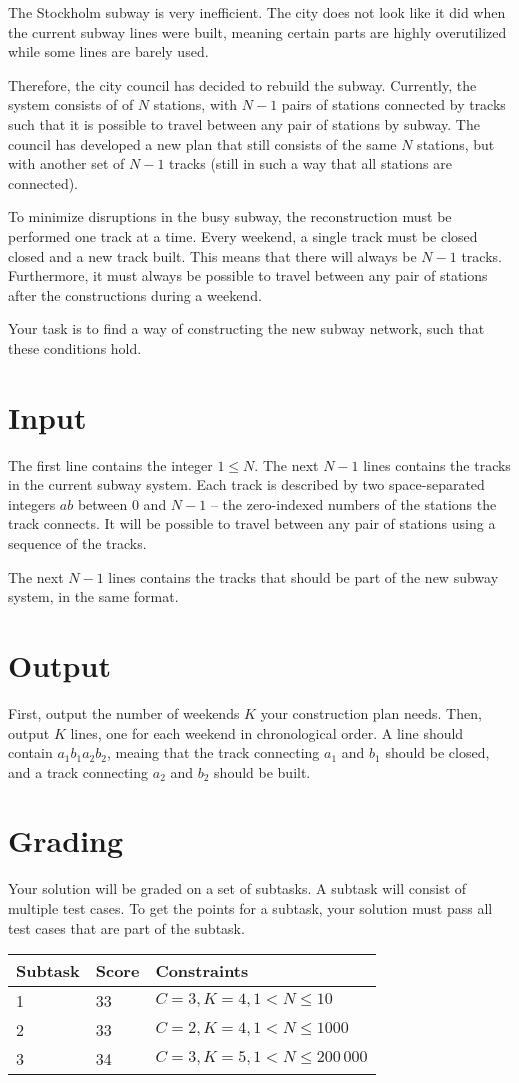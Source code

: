 \def\version{1}
The Stockholm subway is very inefficient.
The city does not look like it did when the current subway lines were built, meaning certain parts are highly overutilized while some lines are barely used.

Therefore, the city council has decided to rebuild the subway.
Currently, the system consists of of $N$ stations, with $N - 1$ pairs of stations connected by tracks such that it is possible to travel between any pair of stations by subway.
The council has developed a new plan that still consists of the same $N$ stations, but with another set of $N - 1$ tracks (still in such a way that all stations are connected).

To minimize disruptions in the busy subway, the reconstruction must be performed one track at a time.
Every weekend, a single track must be closed closed and a new track built.
This means that there will always be $N - 1$ tracks.
Furthermore, it must always be possible to travel between any pair of stations after the constructions during a weekend.

Your task is to find a way of constructing the new subway network, such that these conditions hold.

\section*{Input}
The first line contains the integer $1 \le N$.
The next $N - 1$ lines contains the tracks in the current subway system.
Each track is described by two space-separated integers $a b$ between $0$ and $N - 1$ -- the zero-indexed numbers of the stations the track connects.
It will be possible to travel between any pair of stations using a sequence of the tracks.

The next $N - 1$ lines contains the tracks that should be part of the new subway system, in the same format.

\section*{Output}
First, output the number of weekends $K$ your construction plan needs.
Then, output $K$ lines, one for each weekend in chronological order.
A line should contain $a_1 b_1 a_2 b_2$, meaing that the track connecting $a_1$ and $b_1$ should be closed, and a track connecting $a_2$ and $b_2$ should be built.

\section*{Grading}
Your solution will be graded on a set of subtasks.
A subtask will consist of multiple test cases.
To get the points for a subtask, your solution must pass all test cases that are part of the subtask.

\noindent
\begin{tabular}{| l | l | l |}
\hline
Subtask & Score & Constraints \\ \hline
1       & 33    & $C = 3, K = 4, 1 < N \le 10$ \\ \hline
2       & 33    & $C = 2, K = 4, 1 < N \le 1000$ \\ \hline
3       & 34    & $C = 3, K = 5, 1 < N \le 200\,000$ \\ \hline
\end{tabular}
